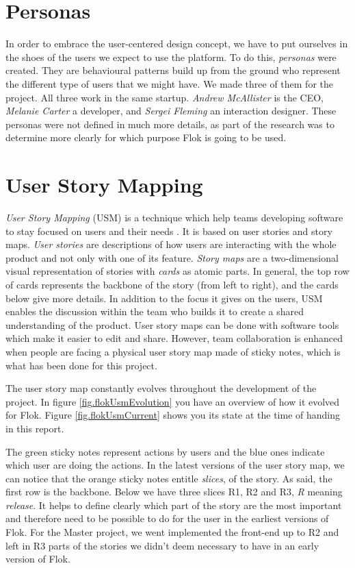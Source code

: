\documentclass[a4paper,12pt, oneside]{article}
\begin{document}
\section{Personas}
In order to embrace the user-centered design concept, we have to put ourselves in the shoes of the users we expect to use the platform. To do this, \emph{personas} were created.
They are behavioural patterns build up from the ground who represent the different type of users that we might have.
We made three of them for the project.
All three work in the same startup. \emph{Andrew McAllister} is the CEO, \emph{Melanie Carter} a developer, and \emph{Sergei Fleming} an interaction designer.
These personas were not defined in much more details, as part of the research was to determine more clearly for which purpose Flok is going to be used.

\section{User Story Mapping}
\emph{User Story Mapping} (USM) is a technique which help teams developing software to stay focused on users and their needs \cite{patton2014user}.
It is based on user stories and story maps. \emph{User stories} are descriptions of how users are interacting with the whole product and not only with one of its feature. \emph{Story maps} are a two-dimensional visual representation of stories with \emph{cards} as atomic parts.
In general, the top row of cards represents the backbone of the story (from left to right), and the cards below give more details.
In addition to the focus it gives on the users, USM enables the discussion within the team who builds it to create a shared understanding of the product.
User story maps can be done with software tools which make it easier to edit and share. However, team collaboration is enhanced when people are facing a physical user story map made of sticky notes, which is what has been done for this project.

The user story map constantly evolves throughout the development of the project.
In figure \ref{fig.flokUsmEvolution} you have an overview of how it evolved for Flok.
Figure \ref{fig.flokUsmCurrent} shows you its state at the time of handing in this report.

The green sticky notes represent actions by users and the blue ones indicate which user are doing the actions.
In the latest versions of the user story map, we can notice that the orange sticky notes entitle \emph{slices}, of the story.
As said, the first row is the backbone.
Below we have three slices R1, R2 and R3, \emph{R} meaning \emph{release}.
It helps to define clearly which part of the story are the most important and therefore need to be possible to do for the user in the earliest versions of Flok. For the Master project, we went implemented the front-end up to R2 and left in R3 parts of the stories we didn't deem necessary to have in an early version of Flok.
\end{document}
